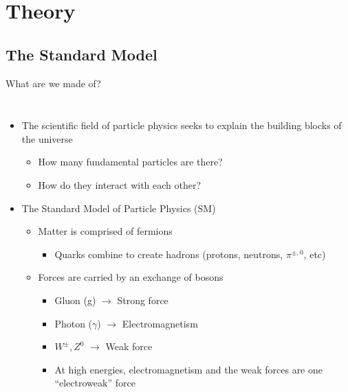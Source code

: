 \documentclass[aspectratio=169,xcolor=table]{beamer}
\begin{document}
\section{Theory }
  
  \subsection{The Standard Model }
  \begin{frame}[t]{What are we made of?}
    \begin{columns}
      \begin{itemize}
        \item The scientific field of particle physics seeks to explain the building blocks of the universe
        \begin{itemize}
          \item How many fundamental particles are there?
          \item How do they interact with each other?
        \end{itemize}
        \item The Standard Model of Particle Physics (SM)
        \begin{itemize}
          \item Matter is comprised of fermions
            \begin{itemize}
              \item Quarks combine to create hadrons (protons, neutrons, $\pi^{\pm,0}$, etc)
            \end{itemize}
          \item Forces are carried by an exchange of bosons
            \begin{itemize}
              \item Gluon (g) $\to$ Strong force
              \item Photon ($\gamma$) $\to$ Electromagnetism
              \item $W^{\pm},Z^{0}$ $\to$ Weak force
              \item At high energies, electromagnetism and the weak forces are one ``electroweak'' force

\end{itemize}
\end{itemize}
\end{itemize}
\end{columns}
\end{frame}
\end{document}
